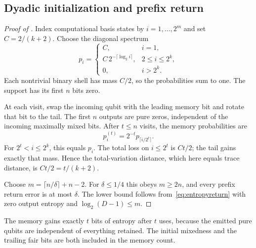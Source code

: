 \subsection{Dyadic initialization and prefix return}
\begin{proof}[Proof of ]
Index computational basis states by $i=1,\ldots,2^m$ and set $C=2/(k+2)$. Choose the diagonal spectrum
\begin{equation}
 p_i=\begin{cases}
 C,&i=1,\\
 C\,2^{-\lceil\log_2 i\rceil},&2\le i\le2^k,\\
 0,&i>2^k.
 \end{cases}
 \label{eq:dyadicspectrum}
\end{equation}
Each nontrivial binary shell has mass $C/2$, so the probabilities sum to one. The support has its first $n$ bits zero.

At each visit, swap the incoming qubit with the leading memory bit and rotate that bit to the tail. The first $n$ outputs are pure zeros, independent of the incoming maximally mixed bits. After $t\le n$ visits, the memory probabilities are
\begin{equation}
 p_i^{(t)}=2^{-t}p_{\lceil i/2^t\rceil}.
 \label{eq:dyadicshift}
\end{equation}
For $2^t<i\le2^k$, this equals $p_i$. The total loss on $i\le2^t$ is $Ct/2$; the tail gains exactly that mass. Hence the total-variation distance, which here equals trace distance, is $Ct/2=t/(k+2)$.

Choose $m=\lceil n/\delta\rceil+n-2$. For $\delta\le1/4$ this obeys $m\ge2n$, and every prefix return error is at most $\delta$. The lower bound follows from~\eqref{eq:entropyreturn} with zero output entropy and $\log_2(D-1)\le m$.
\end{proof}

The memory gains exactly $t$ bits of entropy after $t$ uses, because the emitted pure qubits are independent of everything retained. The initial mixedness and the trailing fair bits are both included in the memory count.

